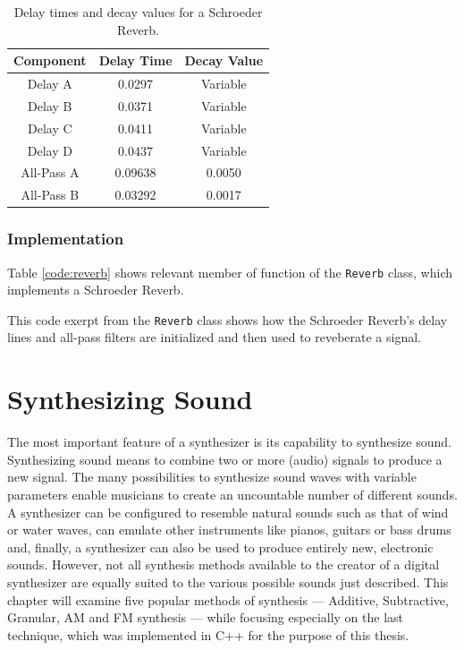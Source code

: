 \documentclass[12pt,twoside]{report}
\begin{document}
\begin{table}[hb!]

  \centering

  \begin{tabular}[]{ | c | c | c |}
    \hline
    \rowcolor[gray]{0.8}
    Component & Delay Time & Decay Value \\\hline
    Delay A & 0.0297 & Variable\\\hline
    Delay B & 0.0371 & Variable \\\hline
    Delay C & 0.0411 & Variable \\\hline
    Delay D & 0.0437 & Variable \\\hline
    All-Pass A & 0.09638 & 0.0050 \\\hline
    All-Pass B & 0.03292 & 0.0017\\
    \hline
  \end{tabular}

  \caption{Delay times and decay values for a Schroeder Reverb.}

  \label{tb:reverb}

\end{table}

\pagebreak

\subsection{Implementation}

Table \ref{code:reverb} shows relevant member of function of the \texttt{Reverb} class, which implements a Schroeder Reverb.

\begin{table}[h!]
  \caption{This code exerpt from the \texttt{Reverb} class shows how the Schroeder Reverb's delay lines and all-pass filters are initialized and then used to reveberate a signal.}
  \label{code:reverb}
\end{table}

\chapter{Synthesizing Sound}

The most important feature of a synthesizer is its capability to synthesize sound. Synthesizing sound means to combine two or more (audio) signals to produce a new signal. The many possibilities to synthesize sound waves with variable parameters enable musicians to create an uncountable number of different sounds. A synthesizer can be configured to resemble natural sounds such as that of wind or water waves, can emulate other instruments like pianos, guitars or bass drums and, finally, a synthesizer can also be used to produce entirely new, electronic sounds. However, not all synthesis methods available to the creator of a digital synthesizer are equally suited to the various possible sounds just described. This chapter will examine five popular methods of synthesis --- Additive, Subtractive, Granular, AM and FM synthesis --- while focusing especially on the last technique, which was implemented in C++ for the purpose of this thesis.
\end{document}
